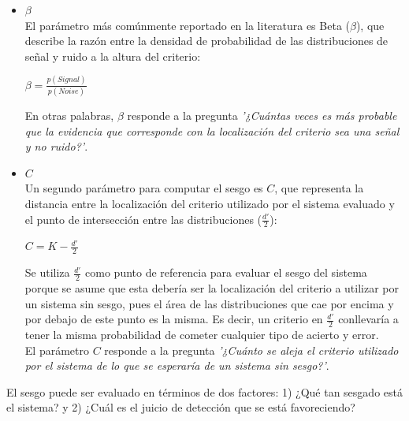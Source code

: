 \begin{itemize}
\begin{itemize}
\item \underline{$\beta$}\\

El parámetro más comúnmente reportado en la literatura es Beta ($\beta$), que describe la razón entre la densidad de probabilidad de las distribuciones de señal y ruido a la altura del criterio: 

\begin{center}
$\beta = \frac{p(Signal)}{p(Noise)}$ \\
\end{center}

En otras palabras, $\beta$ responde a la pregunta \textit{'¿Cuántas veces es más probable que la evidencia que corresponde con la localización del criterio sea una señal y no ruido?'}.\\

\item \underline{$C$}\\

Un segundo parámetro para computar el sesgo es $C$, que representa la distancia entre la localización del criterio utilizado por el sistema evaluado y el punto de intersección entre las distribuciones ($\frac{d'}{2}$):

\begin{center}
$C =  K - \frac{d'}{2}$ \\
\end{center}

Se utiliza $\frac{d'}{2}$ como punto de referencia para evaluar el sesgo del sistema porque se asume que esta debería ser la localización del criterio a utilizar por un sistema sin sesgo, pues el área de las distribuciones que cae por encima y por debajo de este punto es la misma. Es decir, un criterio en $\frac{d'}{2}$ conllevaría a tener la misma probabilidad de cometer cualquier tipo de acierto y error.\\

El parámetro $C$ responde a la pregunta \textit{'¿Cuánto se aleja el criterio utilizado por el sistema de lo que se esperaría de un sistema sin sesgo?'}.\\
\end{itemize}

El sesgo puede ser evaluado en términos de dos factores: 1) ¿Qué tan sesgado está el sistema? y 2) ¿Cuál es el juicio de detección que se está favoreciendo?\\


\end{itemize}
